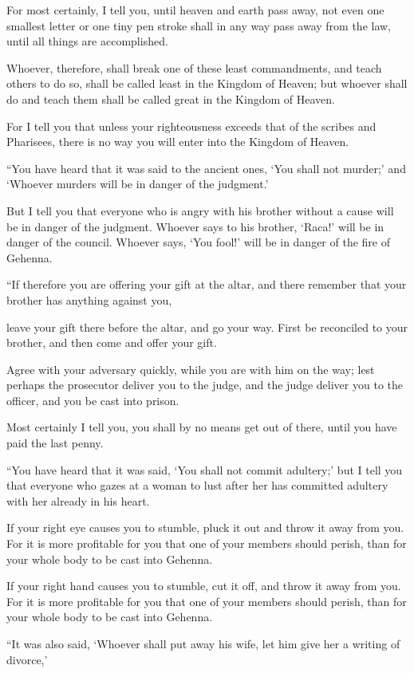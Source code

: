 For most certainly, I tell you, until heaven and earth pass away, not even one smallest letter or one tiny pen stroke shall in any way pass away from the law, until all things are accomplished.

Whoever, therefore, shall break one of these least commandments, and teach others to do so, shall be called least in the Kingdom of Heaven; but whoever shall do and teach them shall be called great in the Kingdom of Heaven.

For I tell you that unless your righteousness exceeds that of the scribes and Pharisees, there is no way you will enter into the Kingdom of Heaven.

“You have heard that it was said to the ancient ones, ‘You shall not murder;’ and ‘Whoever murders will be in danger of the judgment.’

But I tell you that everyone who is angry with his brother without a cause   will be in danger of the judgment. Whoever says to his brother, ‘Raca!’  will be in danger of the council. Whoever says, ‘You fool!’ will be in danger of the fire of Gehenna.

“If therefore you are offering your gift at the altar, and there remember that your brother has anything against you,

leave your gift there before the altar, and go your way. First be reconciled to your brother, and then come and offer your gift.

Agree with your adversary quickly, while you are with him on the way; lest perhaps the prosecutor deliver you to the judge, and the judge deliver you to the officer, and you be cast into prison.

Most certainly I tell you, you shall by no means get out of there, until you have paid the last penny.

“You have heard that it was said,  ‘You shall not commit adultery;’ but I tell you that everyone who gazes at a woman to lust after her has committed adultery with her already in his heart.

If your right eye causes you to stumble, pluck it out and throw it away from you. For it is more profitable for you that one of your members should perish, than for your whole body to be cast into Gehenna.

If your right hand causes you to stumble, cut it off, and throw it away from you. For it is more profitable for you that one of your members should perish, than for your whole body to be cast into Gehenna.

“It was also said, ‘Whoever shall put away his wife, let him give her a writing of divorce,’

